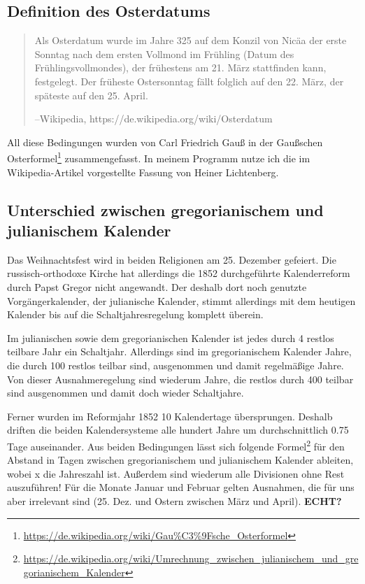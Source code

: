 \subsection{Definition des Osterdatums}
	\begin{quote}
		Als Osterdatum wurde im Jahre 325 auf dem Konzil von Nicäa der erste Sonntag nach dem ersten Vollmond im Frühling (Datum des Frühlingsvollmondes), der frühestens am 21. März stattfinden kann, festgelegt. Der früheste Ostersonntag fällt folglich auf den 22. März, der späteste auf den 25. April.

		\hfill{}--Wikipedia, https://de.wikipedia.org/wiki/Osterdatum
	\end{quote}

	All diese Bedingungen wurden von Carl Friedrich Gauß in der Gaußschen Osterformel\footnote{\url{https://de.wikipedia.org/wiki/Gau\%C3\%9Fsche_Osterformel}} zusammengefasst. In meinem Programm nutze ich die im Wikipedia-Artikel vorgestellte Fassung von Heiner Lichtenberg.
\subsection{Unterschied zwischen gregorianischem und julianischem Kalender}
	Das Weihnachtsfest wird in beiden Religionen am 25. Dezember gefeiert. Die russisch-orthodoxe Kirche hat allerdings die 1852 durchgeführte Kalenderreform durch Papst Gregor nicht angewandt. Der deshalb dort noch genutzte Vorgängerkalender, der julianische Kalender, stimmt allerdings mit dem heutigen Kalender bis auf die Schaltjahresregelung komplett überein.

	Im julianischen sowie dem gregorianischen Kalender ist jedes durch 4 restlos teilbare Jahr ein Schaltjahr. Allerdings sind im gregorianischem Kalender Jahre, die durch 100 restlos teilbar sind, ausgenommen und damit regelmäßige Jahre. Von dieser Ausnahmeregelung sind wiederum Jahre, die restlos durch 400 teilbar sind ausgenommen und damit doch wieder Schaltjahre.

	Ferner wurden im Reformjahr 1852 10 Kalendertage übersprungen. Deshalb driften die beiden Kalendersysteme alle hundert Jahre um durchschnittlich 0.75 Tage auseinander.  Aus beiden Bedingungen lässt sich folgende Formel\footnote{\url{https://de.wikipedia.org/wiki/Umrechnung_zwischen_julianischem_und_gregorianischem_Kalender}} für den Abstand in Tagen zwischen gregorianischem und julianischem Kalender ableiten, wobei x die Jahreszahl ist. Außerdem sind  wiederum alle Divisionen ohne Rest auszuführen! Für die Monate Januar und Februar gelten Ausnahmen, die für uns aber irrelevant sind (25. Dez. und Ostern zwischen März und April). \textbf{ECHT?}

